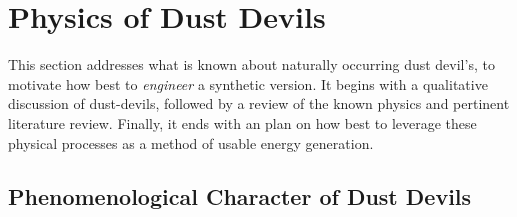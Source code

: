 \section{Physics of Dust Devils}
\label{sec:physics}


This section addresses what is known about naturally occurring dust
devil's, to motivate how best to \textit{engineer} a synthetic version. 
It begins with a qualitative discussion of dust-devils, followed by a
review of the known physics and pertinent literature review. Finally, it
ends with an plan on how best to leverage these physical processes as a
method of usable energy generation.   


\subsection{Phenomenological Character of Dust Devils}


